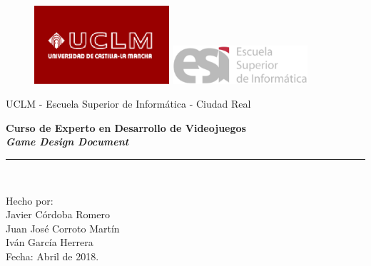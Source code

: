 \documentclass[11pt, twoside]{article}
\begin{document}
\begin{titlepage}
\begin{center}
\vspace*{-1in}
\begin{figure}[htb]
\begin{center}
\includegraphics[width=5cm]{./images/uclm_logo.eps} 
\hspace*{1.5in}
\includegraphics[width=5cm]{./images/esi_logo.eps}
\end{center}
\end{figure}
\end{center}
\begin{center}
UCLM - Escuela Superior de Informática - Ciudad Real\\
\vspace*{0.6in}
\vspace*{0.2in}
\begin{Large}
\textbf{Curso de Experto en Desarrollo de Videojuegos} \\
\textbf{\textit{Game Design Document}} \\
\end{Large}
\vspace*{0.3in}
\vspace*{0.3in}
\rule{80mm}{0.1mm}\\
\vspace*{0.1in}
\begin{large}
Hecho por: \\
Javier Córdoba Romero \\
Juan José Corroto Martín \\
Iván García Herrera \\
\vspace*{0.3in}
Fecha: Abril de 2018.\\
\end{large}
\end{center}

\end{titlepage}
\tableofcontents
\newpage
\end{document}
